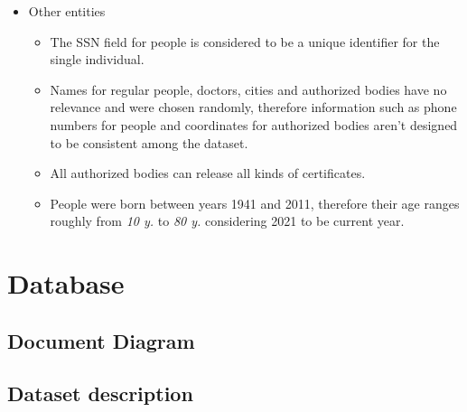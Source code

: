 \documentclass[12pt, a4paper]{article}
\begin{document}
\begin{itemize}
    \item Other entities
    \begin{itemize}
        \item[] The SSN field for people is considered to be a unique
            identifier for the single individual.
        \item[] Names for regular people, doctors, cities and authorized bodies 
            have no relevance and were chosen randomly, therefore information 
            such as phone numbers for people and coordinates for authorized 
            bodies aren't designed to be consistent among the dataset.
        \item[] All authorized bodies can release all kinds of certificates.
        \item[] People were born between years 1941 and 2011, therefore their 
            age ranges roughly from \emph{10 y.} to \emph{80 y.} considering 
            2021 to be current year.
    \end{itemize}

\end{itemize}
  
\clearpage

\section{Database}

\subsection{Document Diagram}

\blindtext

\subsection{Dataset description}
\end{document}
